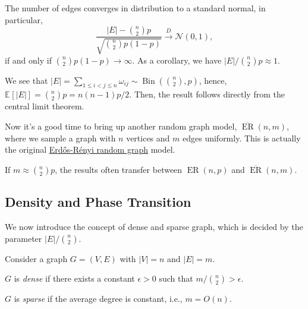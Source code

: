 \begin{claim}
	The number of edges converges in distribution to a standard normal, in particular,
	\[
		\frac{\lvert E \rvert - \binom{n}{2}p}{\sqrt{\binom{n}{2}p (1 - p)} }
		\overset{D}{\to } \mathcal{N} (0, 1),
	\]
	if and only if \(\binom{n}{2}p (1 - p) \to \infty \). As a corollary, we have \(\lvert E \rvert / \binom{n}{2}p \approx 1\).
\end{claim}
\begin{explanation}
	We see that \(\lvert E \rvert = \sum_{1 \leq i < j \leq n} \omega _{ij} \sim \operatorname{Bin}(\binom{n}{2}, p) \), hence, \(\mathbb{E}_{}[\lvert E \rvert ] = \binom{n}{2}p = n(n-1) p / 2\). Then, the result follows directly from the central limit theorem.
\end{explanation}

Now it's a good time to bring up another random graph model, \(\overline{\operatorname{ER}} (n, m)\), where we sample a graph with \(n\) vertices and \(m\) edges uniformly. This is actually the original \hyperref[def:Erdős-Rényi-random-graph]{Erdős-Rényi random graph} model.

\begin{remark}
	If \(m \approx \binom{n}{2}p\), the results often transfer between \(\operatorname{ER}(n, p)\) and \(\overline{\operatorname{ER}} (n, m)\).
\end{remark}

\subsection{Density and Phase Transition}
We now introduce the concept of dense and sparse graph, which is decided by the parameter \(\lvert E \rvert / \binom{n}{2} \).

\begin{definition*}
	Consider a graph \(G = (V, E)\) with \(\lvert V \rvert = n\) and \(\lvert E \rvert = m\).
	\begin{definition}\label{def:dense-graph}
		\(G\) is \emph{dense} if there exists a constant \(\epsilon > 0\) such that \(m / \binom{n}{2} > \epsilon \).
	\end{definition}

	\begin{definition}\label{def:sparse-graph}
		\(G\) is \emph{sparse} if the average degree is constant, i.e., \(m = O(n)\).
	\end{definition}
\end{definition*}



